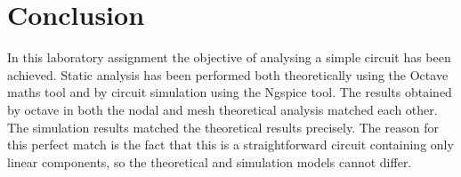 \section{Conclusion}
\label{sec:conclusion}
\vspace{10mm}
In this laboratory assignment the objective of analysing a simple circuit has been
achieved. 
Static analysis has been performed both
theoretically using the Octave maths tool and by circuit simulation using the
Ngspice tool. 
The results obtained by octave in both the nodal and mesh theoretical analysis matched each other. 
The simulation results matched the theoretical results precisely.
The reason for this perfect match is the fact that this is a
straightforward circuit containing only linear components, so the theoretical
and simulation models cannot differ.

